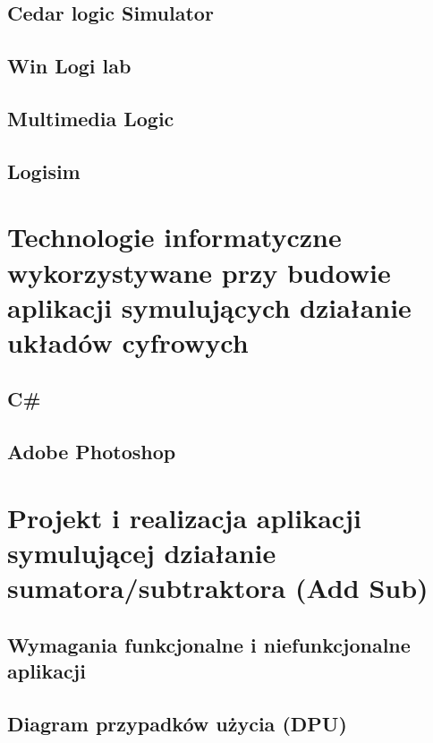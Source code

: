 \documentclass[12pt, a4paper, onside, polish]{article}				%
\begin{document}
\cleardoublepage


\subsection{Cedar logic Simulator}
\cleardoublepage

\subsection{Win Logi lab}
\cleardoublepage

\subsection{Multimedia Logic}
\cleardoublepage

\subsection{Logisim}
\cleardoublepage



\section{Technologie informatyczne wykorzystywane przy budowie aplikacji symulujących działanie układów cyfrowych}
\subsection{C\#}
\cleardoublepage




\subsection{Adobe Photoshop}
\cleardoublepage







\section{Projekt i realizacja aplikacji symulującej działanie sumatora/subtraktora (Add Sub)}
\subsection{Wymagania funkcjonalne i niefunkcjonalne aplikacji}
\cleardoublepage

\subsection{Diagram przypadków użycia (DPU)}
\cleardoublepage
\end{document}
